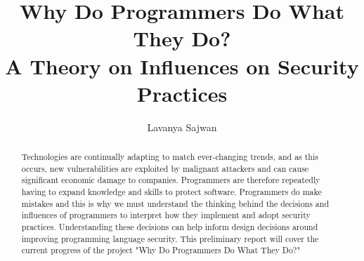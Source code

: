 \documentclass[11pt
              , a4paper
              , twoside
              , openright
              ]{report}
\title{Why Do Programmers Do What They Do? \protect\\ A Theory on Influences on Security Practices}
\author{Lavanya Sajwan}
\date{}
\begin{document}
\frontmatter



\begin{abstract}

Technologies are continually adapting to match ever-changing trends, and as this occurs, new vulnerabilities are exploited by malignant attackers and can cause significant economic damage to companies. Programmers are therefore repeatedly having to expand knowledge and skills to protect software. Programmers do make mistakes and this is why we must understand the thinking behind the decisions and influences of programmers to interpret how they implement and adopt security practices. Understanding these decisions can help inform design decisions around improving programming language security. This preliminary report will cover the current progress of the project "Why Do Programmers Do What They Do?"

\end{abstract}


\maketitle



\tableofcontents



\mainmatter









\backmatter





\end{document}
